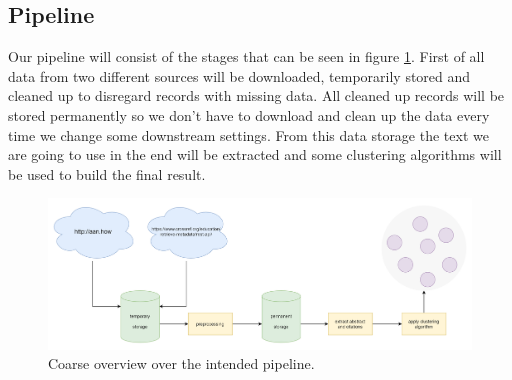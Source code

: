 \subsection{Pipeline}
\label{subsec:pipeline}

Our pipeline will consist of the stages that can be seen in figure \ref{fig:pipeline}. First of all data from two different sources will be downloaded, temporarily stored and cleaned up to disregard records with missing data.
All cleaned up records will be stored permanently so we don't have to download and clean up the data every time we change some downstream settings. From this data storage the text we are going to use in the end will be extracted and some clustering algorithms will be used to build the final result.

\begin{figure}[ht]
    \centering
    \includegraphics[width=\textwidth,keepaspectratio]{figures/pipeline}
    \caption[]{Coarse overview over the intended pipeline.}
    \label{fig:pipeline}
\end{figure}

